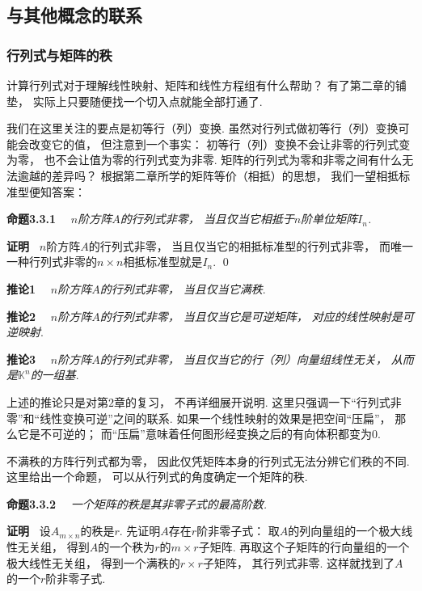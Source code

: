 \subsection{与其他概念的联系}

\subsubsection{行列式与矩阵的秩}

计算行列式对于理解线性映射、矩阵和线性方程组有什么帮助？
有了第二章的铺垫，
实际上只要随便找一个切入点就能全部打通了.

我们在这里关注的要点是初等行（列）变换.
虽然对行列式做初等行（列）变换可能会改变它的值，
但注意到一个事实：
初等行（列）变换不会让非零的行列式变为零，
也不会让值为零的行列式变为非零.
矩阵的行列式为零和非零之间有什么无法逾越的差异吗？
根据第二章所学的矩阵等价（相抵）的思想，
我们一望相抵标准型便知答案：

\medskip

\textbf{命题3.3.1}~~
\textit{$n$阶方阵$A$的行列式非零，
当且仅当它相抵于$n$阶单位矩阵$I_n$.}

\textbf{证明\ }
$n$阶方阵$A$的行列式非零，
当且仅当它的相抵标准型的行列式非零，
而唯一一种行列式非零的$n \times n$相抵标准型就是$I_n$.
\qed 

\medskip

\textbf{推论1}~~
\textit{$n$阶方阵$A$的行列式非零，
当且仅当它满秩}.

\textbf{推论2}~~
\textit{$n$阶方阵$A$的行列式非零，
当且仅当它是可逆矩阵，
对应的线性映射是可逆映射}.

\textbf{推论3}~~
\textit{$n$阶方阵$A$的行列式非零，
当且仅当它的行（列）向量组线性无关，
从而是$\mathbb{K}^n$的一组基}.

\medskip

上述的推论只是对第$2$章的复习，
不再详细展开说明.
这里只强调一下“行列式非零”和“线性变换可逆”之间的联系.
如果一个线性映射的效果是把空间“压扁”，
那么它是不可逆的；
而“压扁”意味着任何图形经变换之后的有向体积都变为$0$.

\medskip

不满秩的方阵行列式都为零，
因此仅凭矩阵本身的行列式无法分辨它们秩的不同.
这里给出一个命题，
可以从行列式的角度确定一个矩阵的秩.

\medskip

\textbf{命题3.3.2}~~
\textit{一个矩阵的秩是其非零子式的最高阶数.}

\textbf{证明\ }
设$A_{m \times n}$的秩是$r$.
先证明$A$存在$r$阶非零子式：
取$A$的列向量组的一个极大线性无关组，
得到$A$的一个秩为$r$的$m \times r$子矩阵.
再取这个子矩阵的行向量组的一个极大线性无关组，
得到一个满秩的$r \times r$子矩阵，
其行列式非零.
这样就找到了$A$的一个$r$阶非零子式.

